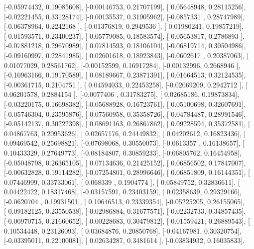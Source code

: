 \documentclass{article}
\begin{document}
       [-0.05974432,  0.19085608],
       [-0.00146753,  0.21707199],
       [ 0.05648948,  0.28115256],
       [-0.02221455,  0.33128174],
       [-0.00135537,  0.31905962],
       [-0.0857331 ,  0.28747989],
       [-0.06378964,  0.2242168 ],
       [-0.01376819,  0.2949536 ],
       [ 0.01980241,  0.19857219],
       [-0.01593571,  0.23400237],
       [ 0.05779085,  0.18583574],
       [-0.05653817,  0.2786893 ],
       [-0.07881218,  0.29670989],
       [ 0.07814593,  0.18106104],
       [-0.06819714,  0.30504986],
       [-0.09160997,  0.22841985],
       [ 0.02601618,  0.18923843],
       [-0.0602617 ,  0.20387063],
       [ 0.01077029,  0.28561762],
       [-0.00152599,  0.16917284],
       [-0.00132996,  0.2668946 ],
       [-0.10963166,  0.19170589],
       [ 0.08189667,  0.23871391],
       [ 0.01664513,  0.32124535],
       [-0.00361715,  0.2104751 ],
       [ 0.04594033,  0.22453258],
       [-0.02069209,  0.2942712 ],
       [ 0.06201578,  0.2884154 ],
       [-0.0077406 ,  0.31783275],
       [ 0.02685186,  0.19873834],
       [-0.03220175,  0.16698382],
       [-0.05688928,  0.16723761],
       [ 0.05100698,  0.32607691],
       [-0.05746304,  0.23595876],
       [ 0.07560958,  0.35358726],
       [ 0.04784487,  0.28991546],
       [-0.05142137,  0.30222398],
       [ 0.08691163,  0.26867862],
       [ 0.09228594,  0.35372581],
       [ 0.04867763,  0.20953626],
       [ 0.02657176,  0.24449832],
       [ 0.04202612,  0.16823436],
       [ 0.09469542,  0.25698821],
       [-0.07698068,  0.30550073],
       [-0.0613357 ,  0.16138657],
       [ 0.10433329,  0.27649773],
       [-0.08184807,  0.30859233],
       [-0.06805762,  0.16454958],
       [-0.05048798,  0.26365105],
       [ 0.07134636,  0.21425152],
       [ 0.06856502,  0.17847007],
       [-0.00632828,  0.19114282],
       [-0.07254801,  0.28996646],
       [ 0.06851809,  0.16144351],
       [ 0.07446999,  0.33733061],
       [ 0.068339  ,  0.1904774 ],
       [ 0.05849752,  0.32836611],
       [ 0.04422422,  0.18317468],
       [-0.03157591,  0.23403159],
       [ 0.02358639,  0.29329166],
       [-0.0620704 ,  0.19931501],
       [ 0.10646513,  0.23339354],
       [-0.05225205,  0.26155065],
       [-0.09182125,  0.23550538],
       [-0.02986884,  0.31677571],
       [-0.02232733,  0.34857435],
       [-0.00970715,  0.21660652],
       [ 0.00228683,  0.30479812],
       [-0.01559421,  0.26889543],
       [ 0.10534448,  0.23126093],
       [ 0.03684876,  0.20850768],
       [-0.04167981,  0.30320754],
       [-0.03395011,  0.22100081],
       [ 0.02634287,  0.3481614 ],
       [-0.03834932,  0.16035833],
\end{document}
